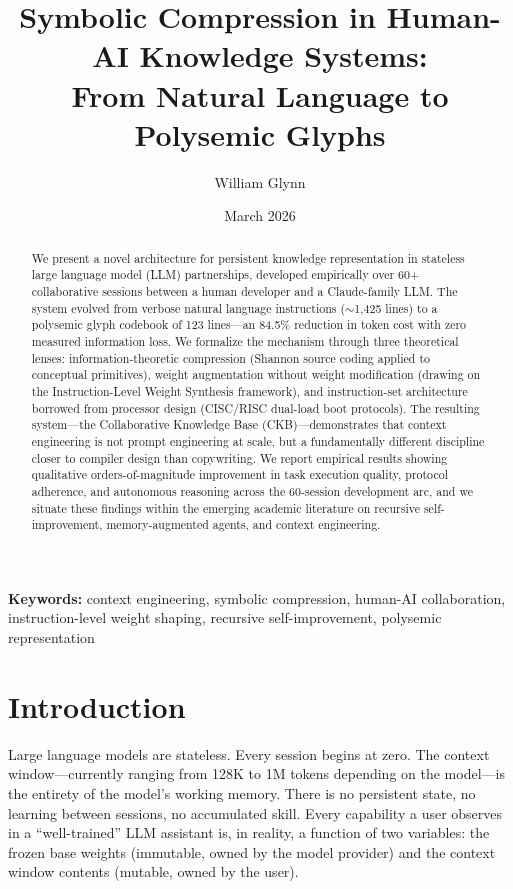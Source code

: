 \documentclass[11pt, a4paper]{article}
\title{\textbf{Symbolic Compression in Human-AI Knowledge Systems:\\From Natural Language to Polysemic Glyphs}}
\author[1]{William Glynn}
\affil[1]{VibeSwap --- Independent Research}
\date{March 2026}
\begin{document}
\maketitle

\begin{abstract}
We present a novel architecture for persistent knowledge representation in stateless large language model (LLM) partnerships, developed empirically over 60+ collaborative sessions between a human developer and a Claude-family LLM. The system evolved from verbose natural language instructions ($\sim$1,425 lines) to a polysemic glyph codebook of 123 lines---an 84.5\% reduction in token cost with zero measured information loss. We formalize the mechanism through three theoretical lenses: information-theoretic compression (Shannon source coding applied to conceptual primitives), weight augmentation without weight modification (drawing on the Instruction-Level Weight Synthesis framework), and instruction-set architecture borrowed from processor design (CISC/RISC dual-load boot protocols). The resulting system---the Collaborative Knowledge Base (CKB)---demonstrates that context engineering is not prompt engineering at scale, but a fundamentally different discipline closer to compiler design than copywriting. We report empirical results showing qualitative orders-of-magnitude improvement in task execution quality, protocol adherence, and autonomous reasoning across the 60-session development arc, and we situate these findings within the emerging academic literature on recursive self-improvement, memory-augmented agents, and context engineering.
\end{abstract}

\noindent\textbf{Keywords:} context engineering, symbolic compression, human-AI collaboration, instruction-level weight shaping, recursive self-improvement, polysemic representation

\section{Introduction}
\label{sec:introduction}

Large language models are stateless. Every session begins at zero. The context window---currently ranging from 128K to 1M tokens depending on the model---is the entirety of the model's working memory. There is no persistent state, no learning between sessions, no accumulated skill. Every capability a user observes in a ``well-trained'' LLM assistant is, in reality, a function of two variables: the frozen base weights (immutable, owned by the model provider) and the context window contents (mutable, owned by the user).
\end{document}
